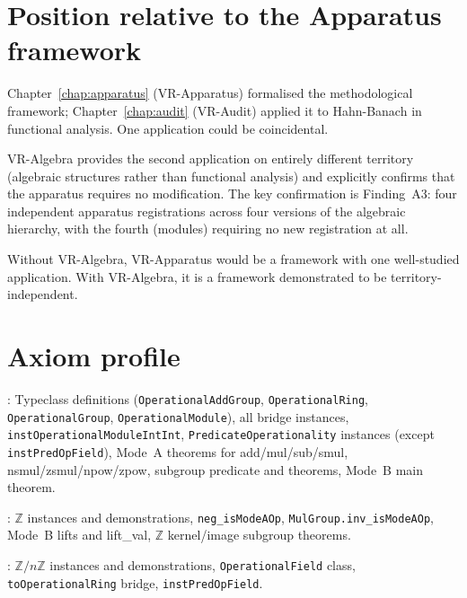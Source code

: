 \section{Position relative to the Apparatus framework}
\label{sec:algebra_vs_apparatus}

\begin{remark}
\label{rem:algebra_confirms_apparatus}
Chapter~\ref{chap:apparatus} (VR-Apparatus) formalised the methodological
framework; Chapter~\ref{chap:audit} (VR-Audit) applied it to Hahn-Banach
in functional analysis.  One application could be coincidental.

VR-Algebra provides the second application on entirely different territory
(algebraic structures rather than functional analysis) and explicitly
confirms that the apparatus requires no modification.  The key confirmation
is Finding~A3: four independent apparatus registrations across four versions
of the algebraic hierarchy, with the fourth (modules) requiring no new
registration at all.

Without VR-Algebra, VR-Apparatus would be a framework with one well-studied
application.  With VR-Algebra, it is a framework demonstrated to be
territory-independent.
\end{remark}

\section{Axiom profile}
\label{sec:algebra_axiom_profile}

\axiomprofile{[]}: Typeclass definitions (\texttt{OperationalAddGroup},
\texttt{OperationalRing}, \texttt{OperationalGroup}, \texttt{OperationalModule}),
all bridge instances, \texttt{instOperationalModuleIntInt},
\texttt{PredicateOperationality} instances (except \texttt{instPredOpField}),
Mode~A theorems for add/mul/sub/smul, nsmul/zsmul/npow/zpow,
subgroup predicate and theorems, Mode~B main theorem.

\axiomprofile{[propext]}: $\mathbb{Z}$ instances and demonstrations,
\texttt{neg\_isModeAOp}, \texttt{MulGroup.inv\_isModeAOp},
Mode~B lifts and lift\_val, $\mathbb{Z}$ kernel/image subgroup theorems.

: $\mathbb{Z}/n\mathbb{Z}$ instances and
demonstrations, \texttt{OperationalField} class, \texttt{toOperationalRing}
bridge, \texttt{instPredOpField}.

